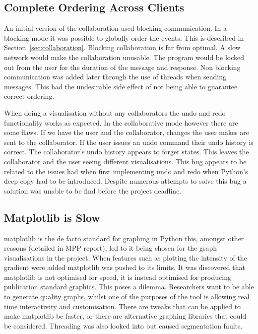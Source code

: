 \subsection{Complete Ordering Across Clients}

An initial version of the collaboration used blocking communication.  In a blocking mode it was possible to globally order the events.  This is described in Section~\ref{sec:collaboration}.  Blocking collaboration is far from optimal.  A slow network would make the collaboration unusable.  The program would be locked out from the user for the duration of the message and response.  Non blocking communication was added later through the use of threads when sending messages.  This had the undesirable side effect of not being able to guarantee correct ordering.


When doing a visualisation without any collaborators the undo and redo functionality works as expected.  In the collaborative mode however there are some flaws.  If we have the user and the collaborator, changes the user makes are sent to the collaborator.  If the user issues an undo command their undo history is correct.  The collaborator's undo history appears to forget states.  This leaves the collaborator and the user seeing different visualisations.  This bug appears to be related to the issues had when first implementing undo and redo when Python's deep copy had to be introduced.  Despite numerous attempts to solve this bug a solution was unable to be find before the project deadline.

\subsection{Matplotlib is Slow}

matplotlib is the de facto standard for graphing in Python this, amongst other reasons (detailed in MPP report), led to it being chosen for the graph visualisations in the project.  When features such as plotting the intensity of the gradient were added matplotlib was pushed to its limits.  It was discovered that matplotlib is not optimised for speed, it is instead optimised for producing publication standard graphics.  This poses a dilemma.  Researchers want to be able to generate quality graphs, whilst one of the purposes of the tool is allowing real time interactivity and customisation.  There are tweaks that can be applied to make matplotlib be faster, or there are alternative graphing libraries that could be considered.  Threading was also looked into but caused segmentation faults.

